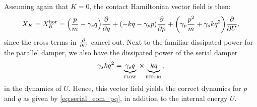 Assuming again that \(K = 0\), the contact Hamiltonian vector field is then:
\begin{equation}
     X_K = X_K^\text{hor} = \qty(\frac{p}{m} - \gamma_s q)\pdv{}{q} + \qty(-kq -\gamma_p p)\pdv{}{p} + \qty(\gamma_p\frac{p^2}{m} + \gamma_s kq^2 )\pdv{}{U},
\end{equation}
since the cross terms in \(\pdv{}{U}\) cancel out. Next to the familiar dissipated power for the parallel damper, we also have the dissipated power of the serial damper
\begin{equation}
     \gamma_s kq^2 = \underbrace{\gamma_s q}_\text{\textsc{flow}} \: \times \underbrace{kq}_\text{\textsc{effort}},
\end{equation} 
in the dynamics of \(U\). Hence, this vector field yields the correct dynamics for \(p\) and \(q\) as given by \cref{eq:serial_eom_pq}, in addition to the internal energy \(U\).

